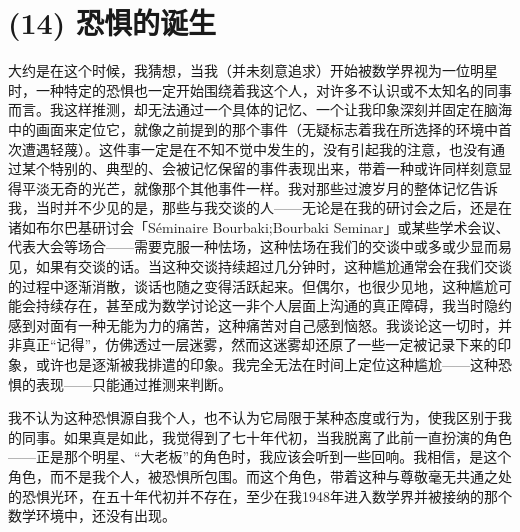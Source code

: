 \section{(14) 恐惧的诞生}

大约是在这个时候，我猜想，当我（并未刻意追求）开始被数学界视为一位明星时，一种特定的恐惧也一定开始围绕着我这个人，对许多不认识或不太知名的同事而言。我这样推测，却无法通过一个具体的记忆、一个让我印象深刻并固定在脑海中的画面来定位它，就像之前提到的那个事件（无疑标志着我在所选择的环境中首次遭遇轻蔑）。这件事一定是在不知不觉中发生的，没有引起我的注意，也没有通过某个特别的、典型的、会被记忆保留的事件表现出来，带着一种或许同样刻意显得平淡无奇的光芒，就像那个其他事件一样。我对那些过渡岁月的整体记忆告诉我，当时并不少见的是，那些与我交谈的人——无论是在我的研讨会之后，还是在诸如布尔巴基研讨会「Séminaire Bourbaki;Bourbaki Seminar」或某些学术会议、代表大会等场合——需要克服一种怯场，这种怯场在我们的交谈中或多或少显而易见，如果有交谈的话。当这种交谈持续超过几分钟时，这种尴尬通常会在我们交谈的过程中逐渐消散，谈话也随之变得活跃起来。但偶尔，也很少见地，这种尴尬可能会持续存在，甚至成为数学讨论这一非个人层面上沟通的真正障碍，我当时隐约感到对面有一种无能为力的痛苦，这种痛苦对自己感到恼怒。我谈论这一切时，并非真正“记得”，仿佛透过一层迷雾，然而这迷雾却还原了一些一定被记录下来的印象，或许也是逐渐被我排遣的印象。我完全无法在时间上定位这种尴尬——这种恐惧的表现——只能通过推测来判断。

我不认为这种恐惧源自我个人，也不认为它局限于某种态度或行为，使我区别于我的同事。如果真是如此，我觉得到了七十年代初，当我脱离了此前一直扮演的角色——正是那个明星、“大老板”的角色时，我应该会听到一些回响。我相信，是这个角色，而不是我个人，被恐惧所包围。而这个角色，带着这种与尊敬毫无共通之处的恐惧光环，在五十年代初并不存在，至少在我1948年进入数学界并被接纳的那个数学环境中，还没有出现。

